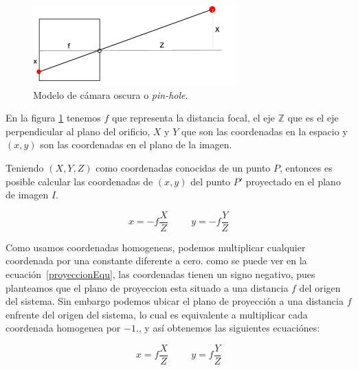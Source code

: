 \begin{figure}
\centering
\includegraphics[width=\textwidth]{GraficosEdArt/pinholecameramodel.jpg}
\caption{Modelo de cámara oscura o \emph{pin-hole}.}
\label{pinhole_diagram}
\end{figure}

En la figura \ref{pinhole_diagram} tenemos $f$ que representa la distancia focal, el eje $\mathbb{Z}$ que es el eje perpendicular al plano del orificio, $X$ y $Y$ que son las coordenadas en la espacio y $(x,y)$ son las coordenadas en el plano de la imagen.

Teniendo $(X,Y,Z)$ como coordenadas conocidas de un punto $P$, entonces es posible calcular las coordenadas de $(x,y)$ del punto $P'$ proyectado en el plano de imagen $I$.

\begin{equation}
    \label{proyeccionEqu}
     x = -f\frac{X}{Z} \hspace{1cm}  y = -f \frac{Y}{Z}  
\end{equation}

Como usamos coordenadas homogeneas, podemos multiplicar cualquier coordenada por una constante diferente a cero. como se puede ver en la ecuación~\ref{proyeccionEqu}, las coordenadas tienen un signo negativo, pues planteamos que el plano de proyeccion esta situado a una distancia $f$ del origen del sistema. Sin embargo podemos ubicar el plano de proyección a una distancia $f$ enfrente del origen del sistema, lo cual es equivalente a multiplicar cada coordenada homogenea por $-1$., y así obtenemos las siguientes ecuaciónes:

\begin{equation}
     x = f\frac{X}{Z} \hspace{1cm}  y = f \frac{Y}{Z}
     \label{proyeccionEqu2}
\end{equation}

